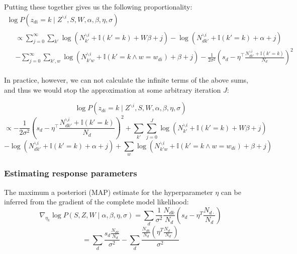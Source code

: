 \documentclass{article} %
\begin{document}
Putting these together gives us the following proportionality:
\begin{equation*}
\begin{gathered}
\log P(z_{di} = k \mid Z^{\backslash{i}}, S, W, \alpha, \beta, \eta, \sigma) \\
\begin{aligned}
&\propto \sum_{j=0}^\infty \sum_{k'}\log(N_{k'}^{\backslash i} + \mathbb{I}(k' = k) + W \beta + j) -\log(N_{d{k'}}^{\backslash i} + \mathbb{I}(k' = k) + \alpha +j)\\
&-\sum_{j=0}^\infty \sum_{k',w} \log(N_{{k'}w}^{\backslash i} + \mathbb{I}(k' = k \wedge w = w_{di}) + \beta + j) -\frac{1}{2 \sigma^2}\left(s_d - \eta^\top \frac{N_{d{k'}}^{\backslash i} + \mathbb{I}(k' = k)}{N_d}\right)^2
\end{aligned}
\end{gathered}
\end{equation*}

In practice, however, we can not calculate the infinite terms of the above sums, and thus we would stop the approximation at some arbitrary iteration $J$:

\[ \log P(z_{di} = k \mid Z^{\backslash{i}}, S, W, \alpha, \beta, \eta, \sigma) \]
\[ \propto -\frac{1}{2 \sigma^2}\left(s_d - \eta^\top \frac{N_{d{k'}}^{\backslash i} + \mathbb{I}(k' = k)}{N_d}\right)^2 + \sum_{k'} \sum_{j=0}^J \log(N_{k'}^{\backslash i} + \mathbb{I}(k' = k) + W \beta + j) \]
\[ -\log(N_{d{k'}}^{\backslash i} + \mathbb{I}(k' = k) + \alpha +j) + \sum_{w} \log(N_{{k'}w}^{\backslash i} + \mathbb{I}(k' = k \wedge w = w_{di}) + \beta + j) \]

\subsubsection{Estimating response parameters}
The maximum a posteriori (MAP) estimate for the hyperparameter \(\eta\)  can be inferred from the gradient of the complete model likelihood:
\begin{equation}
\nabla_{\eta_k} \log P(S, Z, W \mid \alpha, \beta, \eta, \sigma) = \sum_d \frac{1}{\sigma^2} \frac{N_{dk}}{N_d} \left( s_d - \eta^T \frac{N_{d\cdot}}{N_d}\right)
\end{equation}
\[= \sum_d \frac{s_d \frac{N_{dk}}{N_d} }{\sigma^2} - \sum_d \frac{ \frac{N_{dk}}{N_d} \left( \eta^T \frac{N_{d\cdot}}{N_d} \right) }{\sigma^2}\]
\end{document}
